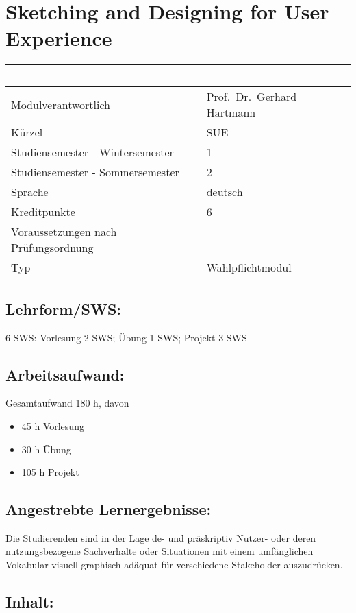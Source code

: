 \chapter{Sketching and Designing for User
Experience}\label{sketching-and-designing-for-user-experience}

\begin{longtable}[]{@{}ll@{}}
\toprule
~ & ~\tabularnewline
\midrule
\endhead
Modulverantwortlich & Prof.~Dr.~Gerhard Hartmann\tabularnewline
Kürzel & SUE\tabularnewline
Studiensemester - Wintersemester & 1\tabularnewline
Studiensemester - Sommersemester & 2\tabularnewline
Sprache & deutsch\tabularnewline
Kreditpunkte & 6\tabularnewline
Voraussetzungen nach Prüfungsordnung &\tabularnewline
Typ & Wahlpflichtmodul\tabularnewline
\bottomrule
\end{longtable}

\section*{Lehrform/SWS:}\label{lehrformsws-7}

6 SWS: Vorlesung 2 SWS; Übung 1 SWS; Projekt 3 SWS

\section*{Arbeitsaufwand:}\label{arbeitsaufwand-13}

Gesamtaufwand 180 h, davon

\begin{itemize}
\item
  45 h Vorlesung
\item
  30 h Übung
\item
  105 h Projekt
\end{itemize}

\section*{Angestrebte
Lernergebnisse:}\label{angestrebte-lernergebnisse-7}

Die Studierenden sind in der Lage de- und präskriptiv Nutzer- oder deren
nutzungsbezogene Sachverhalte oder Situationen mit einem umfänglichen
Vokabular visuell-graphisch adäquat für verschiedene Stakeholder
auszudrücken.

\section*{Inhalt:}\label{inhalt-7}

